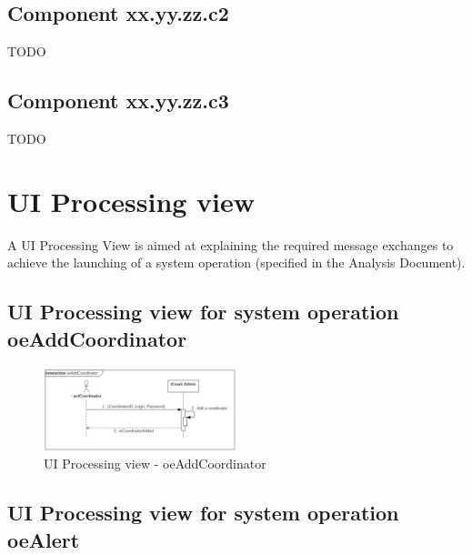 \subsection{Component xx.yy.zz.c2}
TODO

\subsection{Component xx.yy.zz.c3}
TODO





\section{UI Processing view}
A \gls{UI Processing View} is aimed at explaining the required message
exchanges to achieve the launching of a system operation (specified in the \msrmessir
Analysis Document). 





\subsection{UI Processing view for system operation oeAddCoordinator}
\begin{figure}[h]
	\centering	
	\captionsetup{justification=centering}
	\includegraphics[width=0.5\textwidth]{./images/ui_oeAddCoordinator.eps}
	\caption{UI Processing view - oeAddCoordinator}
\end{figure}
 
\subsection{UI Processing view for system operation oeAlert}

